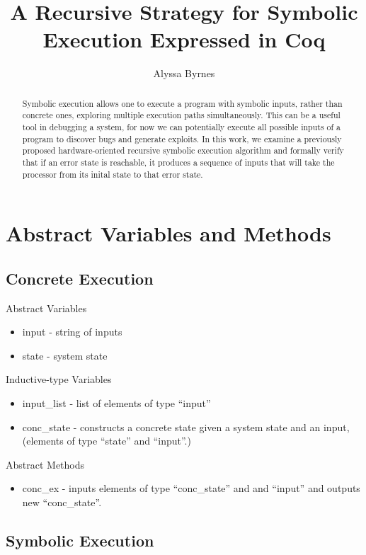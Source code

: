 \documentclass[a4paper]{article}
\title{A Recursive Strategy for Symbolic Execution Expressed in Coq}
\author{Alyssa Byrnes}
\begin{document}
\maketitle

\begin{abstract}
Symbolic execution allows one to execute a program with symbolic inputs, rather than concrete ones, exploring multiple execution paths simultaneously. This can be a useful tool in debugging a system, for now we can potentially execute all possible inputs of a program to discover bugs and generate exploits. In this work, we examine a previously proposed hardware-oriented recursive symbolic execution algorithm and formally verify that if an error state is reachable, it produces a sequence of inputs that will take the processor from its inital state to that error state.
\end{abstract}


\section{Abstract Variables and Methods}
\subsection{Concrete Execution}

Abstract Variables
\begin{itemize}
\item input - string of inputs
\item state - system state
\end{itemize}

Inductive-type Variables
\begin{itemize}
\item input\_list - list of elements of type ``input''
\item conc\_state - constructs a concrete state given a system state and an input, (elements of type ``state'' and ``input''.)
\end{itemize}

Abstract Methods
\begin{itemize}
\item conc\_ex - inputs elements of type ``conc\_state'' and and ``input'' and outputs new ``conc\_state''.
\end{itemize}


\subsection{Symbolic Execution}
\end{document}

